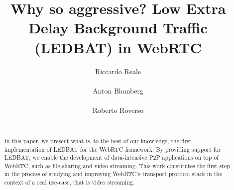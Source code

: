 \documentclass{sig-alternate}
\begin{document}


\title{Why so aggressive? Low Extra Delay Background Traffic (LEDBAT) in WebRTC}


\author{
\alignauthor
Riccardo Reale\\
      \\
\alignauthor
Anton Blomberg\\
      \\
\alignauthor
Roberto Roverso\\
      \\
}

\newcommand{\mysec}[1]{\vspace*{-0.0cm}\section{#1}}
\newcommand{\mysubsec}[1]{\vspace*{-0.0cm}\subsection{#1}\vspace*{0cm}}
\newcommand{\mysubsubsec}[1]{\vspace*{-0.0cm}\subsubsection{#1}\vspace*{0cm}}
\newcommand{\mypar}[1]{\vspace*{-0cm}\paragraph{#1}\vspace*{0cm}}

\maketitle

\begin{abstract}
  In this paper, we present what is, to the best of our knowledge, the first
  implementation of LEDBAT for the WebRTC framework. By providing support for LEDBAT, we
  enable the development of data-intensive P2P applications on top of WebRTC, such as
  file-sharing and video streaming. This work constitutes the first step in the process of
  studying and improving WebRTC's transport protocol stack in the context of a real
  use-case, that is video streaming. 
\end{abstract}
\end{document}
